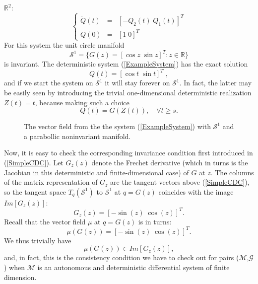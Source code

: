 $\mathbb{R}^2$:
\begin{equation}
\label{ExampleSystem}
\left\{
\begin{array}{rcl}
\dot{Q}(t)&=&[-Q_2(t)\; Q_1(t)]^T \\
Q(0)&=&[1\; 0]^T
\end{array}
\right.
\end{equation}
For this system the unit circle manifold 
$$\mathcal{S}^1=\{G(z)=[\cos z \;\sin z]^T : z\in \mathbb{R}\}$$ is
invariant. The deterministic system (\ref{ExampleSystem}) has the
exact solution $$Q(t)=[\cos t\; \sin t]^T\; ,$$ and if we start the system on
$\mathcal{S}^1$ it will stay forever on $\mathcal{S}^1$. In fact, the
latter may be easily seen by introducing the trivial one-dimensional 
deterministic realization $Z(t)=t$, because making such a choice
$$
Q(t)=G(Z(t)),\quad \forall t\geq s.
$$
\begin{figure}[h!]
\centering
\caption{The vector field from the the system (\ref{ExampleSystem})
  with $\mathcal{S}^1$ and a parabollic noninvariant manifold.}
\end{figure}
Now, it is easy to check the corresponding invariance condition first
introduced in (\ref{SimpleCDC}). Let $G_z(z)$ denote the Frechet
derivative (which in turns is the Jacobian in this deterministic and
finite-dimensional case) of $G$ at $z$. The columns of the matrix
representation of $G_z$ are the tangent vectors above
(\ref{SimpleCDC}), so the tangent space $T_q(\mathcal{S}^1)$ to
$\mathcal{S}^1$ at $q=G(z)$ coincides with the image $Im[G_z(z)]$:
$$
G_z(z)=[ -\sin(z) \;\cos(z) ]^T.
$$
Recall that the vector field $\mu$ at $q=G(z)$ is in turns:
$$
\mu(G(z))=[ -\sin(z) \;\cos(z) ]^T.
$$
We thus trivially have
$$
\mu(G(z)) \in Im[ G_z(z)],
$$
and, in fact, this is the consistency condition we have to check out
for pairs ($\mathcal{M}$,$\mathcal{G}$) when $\mathcal{M}$ is an
autonomous and deterministic differential system of finite dimension.
\newpage\mbox{}\thispagestyle{empty}

